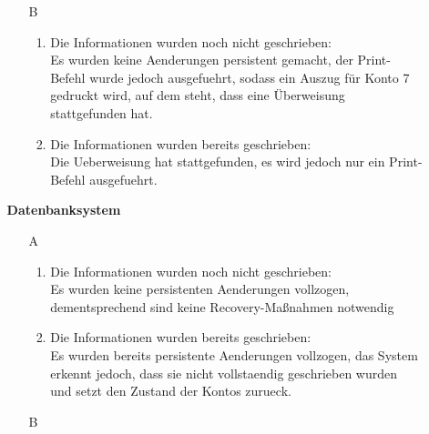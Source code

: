 \documentclass{article}
\begin{document}
\begin{enumerate}
\begin{itemize}
\begin{enumerate}
\begin{enumerate}
                                \end{enumerate}
                                \item[B]
                                \begin{enumerate}
                                        \item Die Informationen wurden noch nicht geschrieben: \\
                                                Es wurden keine Aenderungen persistent gemacht, der Print-Befehl wurde jedoch ausgefuehrt, sodass ein Auszug für Konto 7 gedruckt wird, auf dem steht, dass eine Überweisung stattgefunden hat. 
                                        \item Die Informationen wurden bereits geschrieben: \\
                                                Die Ueberweisung hat stattgefunden, es wird jedoch nur ein Print-Befehl ausgefuehrt. \\
                                \end{enumerate}
                        \end{enumerate}
                \item[\textbf{Datenbanksystem}]
                \begin{enumerate}
                                \item[A]
                                \begin{enumerate}
                                        \item Die Informationen wurden noch nicht geschrieben: \\
                                                Es wurden keine persistenten Aenderungen vollzogen, dementsprechend sind keine Recovery-Maßnahmen notwendig \\
                                        \item Die Informationen wurden bereits geschrieben: \\
                                                Es wurden bereits persistente Aenderungen vollzogen, das System erkennt jedoch, dass sie nicht vollstaendig geschrieben wurden und setzt den Zustand der Kontos zurueck. \\
                                \end{enumerate}
                                \item[B]
                                \begin{enumerate}

\end{enumerate}
\end{enumerate}
\end{itemize}
\end{enumerate}
\end{document}

